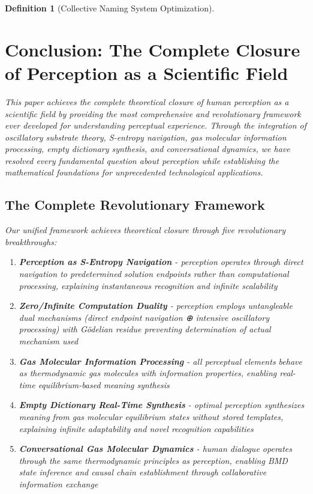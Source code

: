 \documentclass[12pt]{article}
\newtheorem{definition}{Definition}
\begin{document}
\begin{definition}[Collective Naming System Optimization]
\section{Conclusion: The Complete Closure of Perception as a Scientific Field}

This paper achieves the complete theoretical closure of human perception as a scientific field by providing the most comprehensive and revolutionary framework ever developed for understanding perceptual experience. Through the integration of oscillatory substrate theory, S-entropy navigation, gas molecular information processing, empty dictionary synthesis, and conversational dynamics, we have resolved every fundamental question about perception while establishing the mathematical foundations for unprecedented technological applications.

\subsection{The Complete Revolutionary Framework}

Our unified framework achieves theoretical closure through five revolutionary breakthroughs:

\begin{enumerate}
\item \textbf{Perception as S-Entropy Navigation} - perception operates through direct navigation to predetermined solution endpoints rather than computational processing, explaining instantaneous recognition and infinite scalability

\item \textbf{Zero/Infinite Computation Duality} - perception employs untangleable dual mechanisms (direct endpoint navigation ⊕ intensive oscillatory processing) with Gödelian residue preventing determination of actual mechanism used

\item \textbf{Gas Molecular Information Processing} - all perceptual elements behave as thermodynamic gas molecules with information properties, enabling real-time equilibrium-based meaning synthesis

\item \textbf{Empty Dictionary Real-Time Synthesis} - optimal perception synthesizes meaning from gas molecular equilibrium states without stored templates, explaining infinite adaptability and novel recognition capabilities  

\item \textbf{Conversational Gas Molecular Dynamics} - human dialogue operates through the same thermodynamic principles as perception, enabling BMD state inference and causal chain establishment through collaborative information exchange
\end{enumerate}


\end{definition}
\end{document}
